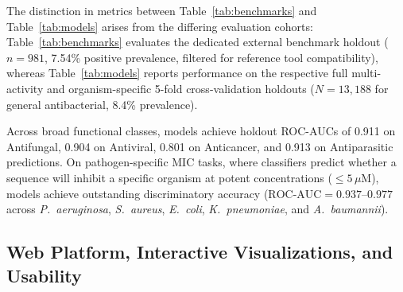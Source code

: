 \documentclass[unnumsec,webpdf,contemporary,large]{oup-authoring-template}%
\begin{document}
The distinction in metrics between Table~\ref{tab:benchmarks} and Table~\ref{tab:models} arises from the differing evaluation cohorts: Table~\ref{tab:benchmarks} evaluates the dedicated external benchmark holdout ($n=981$, 7.54\% positive prevalence, filtered for reference tool compatibility), whereas Table~\ref{tab:models} reports performance on the respective full multi-activity and organism-specific 5-fold cross-validation holdouts ($N=13,188$ for general antibacterial, 8.4\% prevalence).

Across broad functional classes, models achieve holdout ROC-AUCs of 0.911 on Antifungal, 0.904 on Antiviral, 0.801 on Anticancer, and 0.913 on Antiparasitic predictions. On pathogen-specific MIC tasks, where classifiers predict whether a sequence will inhibit a specific organism at potent concentrations ($\le 5\,\mu\text{M}$), models achieve outstanding discriminatory accuracy ($\text{ROC-AUC} = 0.937$--$0.977$ across \textit{P.~aeruginosa}, \textit{S.~aureus}, \textit{E.~coli}, \textit{K.~pneumoniae}, and \textit{A.~baumannii}).

\subsection{Web Platform, Interactive Visualizations, and Usability}
\end{document}
